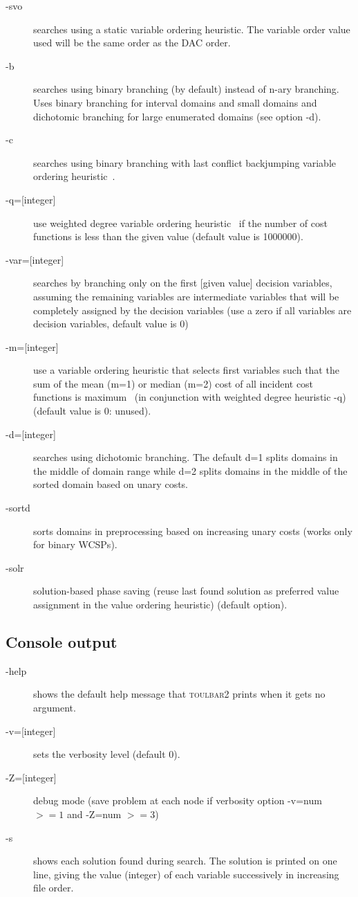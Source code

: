 \documentclass{article}
\def\toulbar2{\textsc{toulbar2}}
\begin{document}
\begin{description}
\item[-svo] searches using a static variable ordering heuristic. The
  variable order value used will be the same order as the DAC order.
\item[-b] searches using binary branching (by default) instead of n-ary branching.
  Uses binary branching for interval domains and small domains
  and dichotomic branching for large enumerated domains (see option -d).
\item[-c] searches using binary branching with last conflict
  backjumping variable ordering heuristic~\cite{Lecoutre09}.
\item[{-q=[integer]}] use
  weighted degree variable ordering heuristic~\cite{boussemart2004} if the number of cost
  functions is less than the given value (default value is 1000000).
\item[{-var=[integer]}]
  searches by branching only on the first [given value]
  decision variables, assuming the remaining variables are
  intermediate variables that will be completely assigned by the
  decision variables (use a zero if all variables are decision
  variables, default value is 0)
\item[{-m=[integer]}]
  use a variable ordering heuristic that selects first variables such
  that the sum of the mean (m=1) or median (m=2) cost of all incident
  cost functions is maximum~\cite{Schiex14a} (in conjunction with weighted degree
  heuristic -q) (default value is 0: unused).
\item[{-d=[integer]}]
  searches using dichotomic branching. The default d=1 splits domains
  in the middle of domain range while d=2 splits domains in the middle
  of the sorted domain based on unary costs. 
\item[-sortd] sorts domains in preprocessing based on increasing unary costs (works only for binary WCSPs).
\item[-solr] solution-based phase saving (reuse last found solution as preferred value assignment in the value ordering heuristic) (default option).
\end{description}

\subsection{Console output}

\begin{description}
\item[-help] shows the default help message that \toulbar2 prints when
  it gets no argument.
\item[{-v=[integer]}] sets the verbosity level (default 0).
\item[{-Z=[integer]}] debug mode (save problem at each node if verbosity
  option -v=num $>= 1$ and -Z=num $>=3$)
\item[-s] shows each solution found during search. The solution is
  printed on one line, giving the value (integer) of each variable
  successively in increasing file order.
\end{description}
\end{document}
